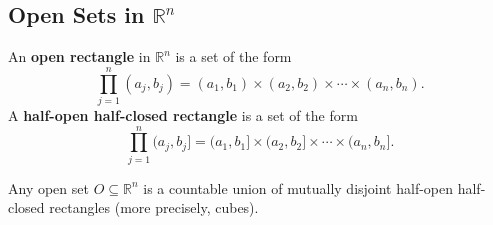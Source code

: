 \documentclass[11pt]{report}
\begin{document}
\subsection{Open Sets in $\mathbb{R}^n$}

\begin{defbox}
An \textbf{open rectangle} in $\mathbb{R}^n$ is a set of the form
\[
\prod_{j=1}^{n} (a_j, b_j) = (a_1, b_1) \times (a_2, b_2) \times \cdots \times (a_n, b_n).
\]
A \textbf{half-open half-closed rectangle} is a set of the form
\[
\prod_{j=1}^{n} (a_j, b_j] = (a_1, b_1] \times (a_2, b_2] \times \cdots \times (a_n, b_n].
\]
\end{defbox}

\begin{propbox}
Any open set $O \subseteq \mathbb{R}^n$ is a countable union of mutually disjoint half-open half-closed rectangles (more precisely, cubes).
\end{propbox}
\end{document}
